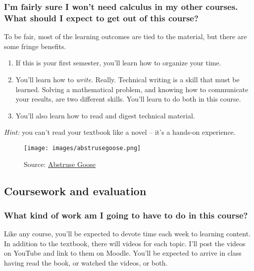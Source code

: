 \documentclass[10pt,]{article}
\begin{document}
\subsubsection[{I'm fairly sure I won't need calculus in my other courses. What should I expect to get out of this course?}]{I'm fairly sure I won't need calculus in my other courses. What should I expect to get out of this course?}\label{subsubsection-8}
\hypertarget{p-15}{}%
To be fair, most of the learning outcomes are tied to the material, but there are some fringe benefits.%
\leavevmode%
\begin{enumerate}
\item\hypertarget{li-12}{}If this is your first semester, you'll learn how to organize your time.%
\item\hypertarget{li-13}{}You'll learn how to \emph{write}. Really. Technical writing is a skill that must be learned. Solving a mathematical problem, and knowing how to communicate your results, are two different skills. You'll learn to do both in this course.%
\item\hypertarget{li-14}{}You'll also learn how to read and digest technical material.%
\end{enumerate}
\hypertarget{p-16}{}%
\emph{Hint:} you can't read your textbook like a novel -- it's a hands-on experience.%
\begin{figure}
\centering
\texttt{[image: images/abstrusegoose.png]}
\caption{Source: \href{https://abstrusegoose.com/353}{Abstruse Goose}\label{figure-1}}
\end{figure}
%
%
\typeout{************************************************}
\typeout{************************************************}
%
\subsection[{Coursework and evaluation}]{Coursework and evaluation}\label{section-evaluation}
%
%
\typeout{************************************************}
\typeout{************************************************}
%
\subsubsection[{What kind of work am I going to have to do in this course?}]{What kind of work am I going to have to do in this course?}\label{subsubsection-9}
\hypertarget{p-17}{}%
Like any course, you'll be expected to devote time each week to learning content. In addition to the textbook, there will videos for each topic. I'll post the videos on YouTube and link to them on Moodle. You'll be expected to arrive in class having read the book, or watched the videos, or both.%
%
%
\typeout{************************************************}
\typeout{************************************************}
%
\end{document}
